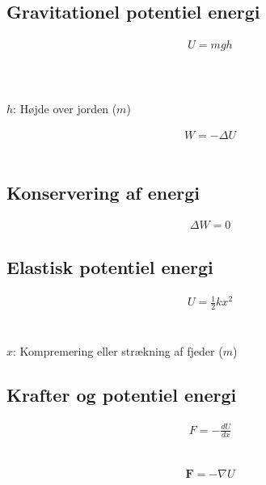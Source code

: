 \subsection{Gravitationel potentiel energi}
	\begin{align}
		U=mgh
	\end{align}
	\pot\\
	\masse\\
	\tyngde\\
	$h$: Højde over jorden ($m$)

	\begin{align}
		W=-\Delta U
	\end{align}
	\arbejde\\
	\pot

\subsection{Konservering af energi}
	\begin{align}
		\Delta W=0
	\end{align}
	\arbejde

\subsection{Elastisk potentiel energi}
	\begin{align}
		U=\frac{1}{2}kx^2
	\end{align}
	\pot\\
	\fjedrkonst\\
	$x$: Kompremering eller strækning af fjeder ($m$)

\subsection{Krafter og potentiel energi}
	\begin{align}
		F=-\frac{dU}{dx}
	\end{align}
	\kraft\\
	\pot

	\begin{align}
		\mathbf{F}=-\nabla U
	\end{align}
	\Kraft\\
	\pot